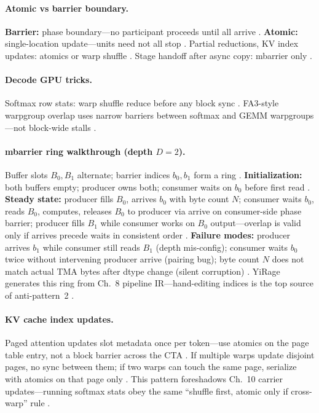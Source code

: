 \paragraph{Atomic vs barrier boundary.}
\textbf{Barrier:} phase boundary---no participant proceeds until all arrive \citep{nvidia2022hopper,shah2024flashattention3}.
\textbf{Atomic:} single-location update---units need not all stop \citep{dao2022flashattention,memoryfloor2026}.
Partial reductions, KV index updates: atomics or warp shuffle \citep{kwon2023vllm,patel2025llminference}.
Stage handoff after async copy: mbarrier only \citep{semianalysis2024tma,yirage2026}.

\paragraph{Decode GPU tricks.}
Softmax row stats: warp shuffle reduce before any block sync \citep{dao2022flashattention,shah2024flashattention3}.
FA3-style warpgroup overlap uses narrow barriers between softmax and GEMM warpgroups---not block-wide stalls \citep{shah2024flashattention3,patel2025llminference}.

\paragraph{mbarrier ring walkthrough (depth $D{=}2$).}
Buffer slots $B_0, B_1$ alternate; barrier indices $b_0, b_1$ form a ring \citep{semianalysis2024tma,dao2022flashattention}.
\textbf{Initialization:} both buffers empty; producer owns both; consumer waits on $b_0$ before first read \citep{shah2024flashattention3,yirage2026}.
\textbf{Steady state:} producer fills $B_0$, arrives $b_0$ with byte count $N$; consumer waits $b_0$, reads $B_0$, computes, releases $B_0$ to producer via arrive on consumer-side phase barrier; producer fills $B_1$ while consumer works on $B_0$ output---overlap is valid only if arrives precede waits in consistent order \citep{nvidia2022hopper,semianalysis2024tma}.
\textbf{Failure modes:} producer arrives $b_1$ while consumer still reads $B_1$ (depth mis-config); consumer waits $b_0$ twice without intervening producer arrive (pairing bug); byte count $N$ does not match actual TMA bytes after dtype change (silent corruption) \citep{taxbreak2026,chen2020compilerbasedhardw}.
YiRage generates this ring from Ch.~8 pipeline IR---hand-editing indices is the top source of anti-pattern~2 \citep{wu2024mirage,yirage2026}.

\paragraph{KV cache index updates.}
Paged attention updates slot metadata once per token---use atomics on the page table entry, not a block barrier across the CTA \citep{kwon2023vllm,dao2023flashdecoding}.
If multiple warps update disjoint pages, no sync between them; if two warps can touch the same page, serialize with atomics on that page only \citep{patel2025llminference,yirage2026}.
This pattern foreshadows Ch.~10 carrier updates---running softmax stats obey the same ``shuffle first, atomic only if cross-warp'' rule \citep{dao2022flashattention,shah2024flashattention3}.

